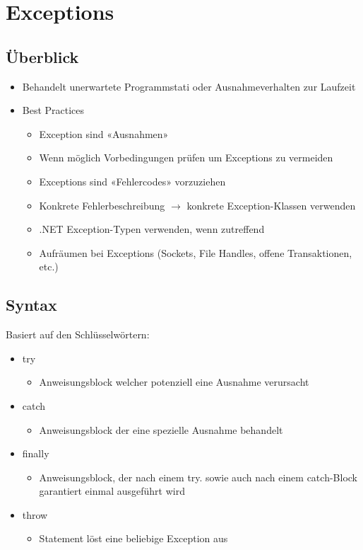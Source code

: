 
\section{Exceptions}

\subsection{Überblick}
\begin{itemize}
    \item Behandelt unerwartete Programmstati oder Ausnahmeverhalten zur Laufzeit
    \item Best Practices
    \begin{itemize}
        \item Exception sind «Ausnahmen»
        \item Wenn möglich Vorbedingungen prüfen um Exceptions zu vermeiden
        \item Exceptions sind «Fehlercodes» vorzuziehen
        \item Konkrete Fehlerbeschreibung $\rightarrow$ konkrete Exception-Klassen verwenden
        \item .NET Exception-Typen verwenden, wenn zutreffend
        \item Aufräumen bei Exceptions (Sockets, File Handles, offene Transaktionen, etc.)
    \end{itemize}
\end{itemize}

\subsection{Syntax}
Basiert auf den Schlüsselwörtern:
\begin{itemize}
    \item try
    \begin{itemize}
        \item Anweisungsblock welcher potenziell eine Ausnahme verursacht
    \end{itemize}
    \item catch
    \begin{itemize}
        \item Anweisungsblock der eine spezielle Ausnahme behandelt
    \end{itemize}
    \item finally
    \begin{itemize}
        \item Anweisungsblock, der nach einem try. sowie auch nach einem catch-Block garantiert einmal ausgeführt wird
    \end{itemize}
    \item throw
    \begin{itemize}
        \item Statement löst eine beliebige Exception aus
    \end{itemize}
\end{itemize}

